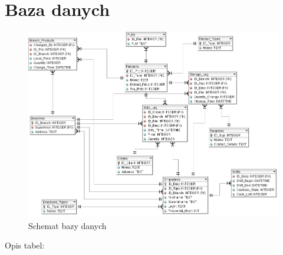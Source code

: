 \section{Baza danych}
\begin{figure}
\includegraphics[width=1\textwidth]{gfx/baza.png}
\caption{Schemat bazy danych}
\end{figure}
Opis tabel:
